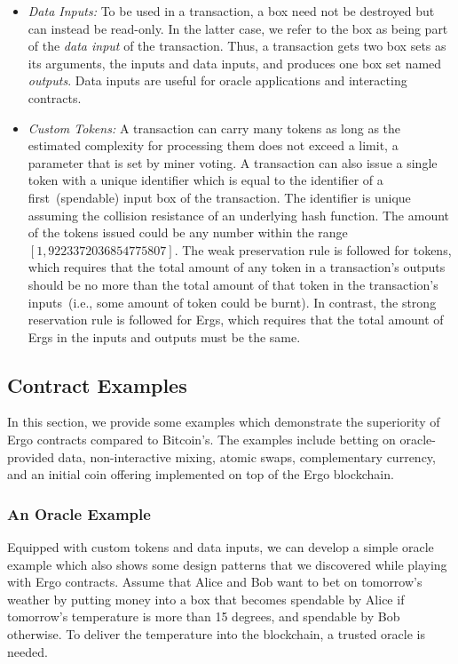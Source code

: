  \begin{itemize}
    \item {\em Data Inputs: }
 To be used in a transaction, a box need not be destroyed but can instead be read-only. In the latter case, we refer to the box as being part of the {\em data input} of the transaction. Thus, a transaction gets two box sets as its arguments, the inputs and
 data inputs, and produces one box set named {\em outputs}. Data inputs are useful for oracle applications and interacting contracts.

    \item {\em Custom Tokens: }
 A transaction can carry many tokens as long as the estimated complexity for processing them does not exceed a limit, a parameter that is set by miner voting. A transaction can also issue a single token with a unique identifier which is equal to the identifier of a first~(spendable) input box of the transaction. The identifier is unique assuming the collision resistance of an underlying hash function.
 The amount of the tokens issued could be any number within the range $[1, 9223372036854775807]$. The weak preservation rule is followed for tokens, which requires that the total amount of any token in a transaction's outputs should be no more
 than the total amount of that token in the transaction's inputs~(i.e., some amount of token could be burnt). In contrast, the strong reservation rule is followed for Ergs, which requires that the total amount of Ergs in the inputs and outputs must be the same.
 \end{itemize}

\subsection{Contract Examples}
\label{sec:examples}

 In this section, we provide some examples which demonstrate the superiority of Ergo contracts compared to Bitcoin's. The examples include betting on oracle-provided data, non-interactive mixing, atomic swaps, complementary currency, and an initial coin offering implemented on top of the Ergo blockchain.

 \subsubsection{An Oracle Example}
 \label{sec:platform}

 Equipped with custom tokens and data inputs, we can develop a simple oracle example which also shows some design patterns that we discovered while playing with Ergo contracts. Assume that Alice and Bob want to bet on tomorrow's weather by putting money into a box that becomes spendable by Alice if tomorrow's temperature is more than 15 degrees, and spendable by Bob otherwise. To deliver the temperature into the blockchain, a trusted oracle is needed.

